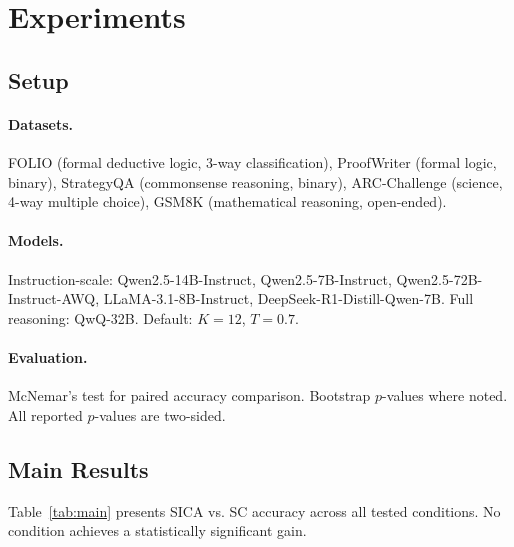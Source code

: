 \documentclass[11pt,a4paper]{article}
\begin{document}
\section{Experiments}

\subsection{Setup}

\paragraph{Datasets.} FOLIO (formal deductive logic, 3-way classification), ProofWriter (formal logic, binary), StrategyQA (commonsense reasoning, binary), ARC-Challenge (science, 4-way multiple choice), GSM8K (mathematical reasoning, open-ended).

\paragraph{Models.} Instruction-scale: Qwen2.5-14B-Instruct, Qwen2.5-7B-Instruct, Qwen2.5-72B-Instruct-AWQ, LLaMA-3.1-8B-Instruct, DeepSeek-R1-Distill-Qwen-7B. Full reasoning: QwQ-32B. Default: $K{=}12$, $T{=}0.7$.

\paragraph{Evaluation.} McNemar's test for paired accuracy comparison. Bootstrap $p$-values where noted. All reported $p$-values are two-sided.

\subsection{Main Results}
\label{sec:main-results}

Table~\ref{tab:main} presents SICA vs. SC accuracy across all tested conditions. No condition achieves a statistically significant gain.
\end{document}
